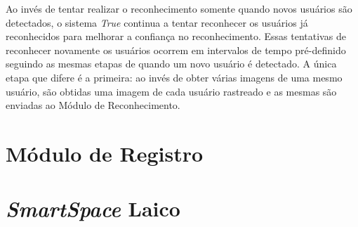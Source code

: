 	Ao invés de tentar realizar o reconhecimento somente quando novos usuários são detectados, o sistema \textit{True} continua a tentar reconhecer os usuários já reconhecidos para melhorar a confiança no reconhecimento. Essas tentativas de reconhecer novamente os usuários ocorrem em intervalos de tempo pré-definido seguindo as mesmas etapas de quando um novo usuário é detectado. A única etapa que difere é a primeira: ao invés de obter várias imagens de uma mesmo usuário, são obtidas uma imagem de cada usuário rastreado e as mesmas são enviadas ao Módulo de Reconhecimento.



\section{Módulo de Registro}

\section{\textit{SmartSpace} Laico}















